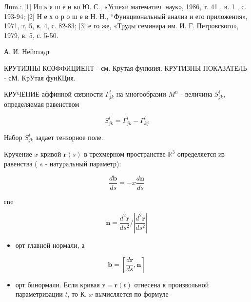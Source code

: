 \documentclass[10pt]{article}
\begin{document}
Лum.: [1] Ил ь я ш е н ко Ю. С., «Успехи математич. наук», 1986, т. 41 , в. 1 , с. 193-94; [2] Н е х о р о ш е в Н. Н., “Функциональный анализ и его приложения», 1971, т. 5, в. 4, с. 82-83; [3] е го же, «Труды семинара им. И. Г. Петровского», 1979, в. 5, с. 5-50.



А. И. Нейuтадт



КРУТИЗНЫ КОЗФФИЦИЕНТ - см. Крутая функиия. КРУТИЗНЫ ПОКАЗАТЕЛЬ - сМ. КрУтая фунКЦия.



КРУЧЕНИЕ аффинной связности $\Gamma_{j k}^{i}$ на многообразии $M^{n}$ - величина $S_{j k}^{i}$, определяемая равенством



\[

S_{j k}^{i}=\Gamma_{j k}^{i}-\Gamma_{k j}^{i}

\]



Набор $S_{j k}^{i}$ задает тензорное поле.



Кручение $x$ кривой $\boldsymbol{r}(s)$ в трехмерном пространстве $\mathbb{R}^{3}$ определяется из равенства ( $s$ - натуральный параметр):



\[

\frac{d \boldsymbol{b}}{d s}=-x \frac{d \boldsymbol{n}}{d s}

\]



rne



\[

\boldsymbol{n}=\frac{d^{2} \boldsymbol{r}}{d s^{2}} /\left|\frac{d^{2} \boldsymbol{r}}{d s^{2}}\right|

\]



\begin{itemize}

  \item орт главной нормали, а

\end{itemize}



\[

\boldsymbol{b}=\left[\frac{d \boldsymbol{r}}{d s}, \boldsymbol{n}\right]

\]



\begin{itemize}

  \item орт бинормали. Если кривая $\boldsymbol{r}=\boldsymbol{r}(t)$ отнесена к произвольной параметризации $t$, то К. $x$ вычисляется по формуле

\end{itemize}
\end{document}
